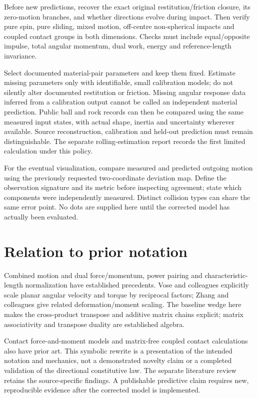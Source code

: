 \documentclass[11pt,a4paper]{article}
\begin{document}
Before new predictions, recover the exact original restitution/friction closure, its zero-motion branches, and whether directions evolve during impact. Then verify pure spin, pure sliding, mixed motion, off-centre non-spherical impacts and coupled contact groups in both dimensions. Checks must include equal/opposite impulse, total angular momentum, dual work, energy and reference-length invariance.

Select documented material-pair parameters and keep them fixed. Estimate missing parameters only with identifiable, small calibration models; do not silently alter documented restitution or friction. Missing angular response data inferred from a calibration output cannot be called an independent material prediction. Public ball and rock records can then be compared using the same measured input states, with actual shape, inertia and uncertainty wherever available. Source reconstruction, calibration and held-out prediction must remain distinguishable. The separate rolling-estimation report records the first limited calculation under this policy.

For the eventual visualization, compare measured and predicted outgoing motion using the previously requested two-coordinate deviation map. Define the observation signature and its metric before inspecting agreement; state which components were independently measured. Distinct collision types can share the same error point. No dots are supplied here until the corrected model has actually been evaluated.

\section{Relation to prior notation}
Combined motion and dual force/momentum, power pairing and characteristic-length normalization have established precedents\cite{featherstone,modernrobotics,angeles}. Vose and colleagues explicitly scale planar angular velocity and torque by reciprocal factors\cite{vose}; Zhang and colleagues give related deformation/moment scaling\cite{zhang}. The baseline wedge here makes the cross-product transpose and additive matrix chains explicit; matrix associativity and transpose duality are established algebra.

Contact force-and-moment models and matrix-free coupled contact calculations also have prior art\cite{drakewrench,mujocowrench,siggraph}. This symbolic rewrite is a presentation of the intended notation and mechanics, not a demonstrated novelty claim or a completed validation of the directional constitutive law. The separate literature review retains the source-specific findings. A publishable predictive claim requires new, reproducible evidence after the corrected model is implemented.
\end{document}

